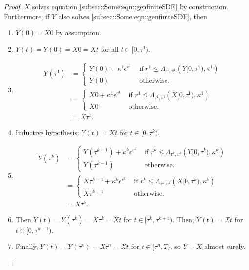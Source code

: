 \documentclass[12pt]{article}
\newcommand{\te}{\text}
\newcommand{\ep}{\epsilon}
\renewcommand{\v}{v}							%
\newcommand{\ev}[1]{\ep^{#1}}					%
\newcommand{\T}{T}								%
\renewcommand{\t}{t}							%
\newcommand{\X}{X}								%
\renewcommand{\r}{r}								%
\newcommand{\rt}[1]{\tau^{#1}}						%
\renewcommand{\it}{k}								%
\newcommand{\rxvtt}[2]{Y_{#1}{(#2)}}				%
\newcommand{\rxvtts}[2]{Y_{#1}{#2}}					%
\newcommand{\ratee}[1]{\Lambda_{#1}}				%
\renewcommand{\mark}[1]{\kappa^{#1}}				%
\begin{document}
\begin{proof}
\(\X{}{}\) solves equation \eqref{subsec::Some:eqn::genfiniteSDE} by construction. Furthermore, if \(\rxvtts{}{}\) also solves \eqref{subsec::Some:eqn::genfiniteSDE}, then 

\begin{enumerate}
\item \(\rxvtt{}{0} = \X{}{0}\) by assumption.

\item \(\rxvtt{}{\t} = \rxvtt{}{0} = \X{}{0} = \X{}{\t}\) for all \(\t\in [0,\rt{1})\).

\item 

\begin{align*}
\rxvtt{}{\rt{1}} &= \begin{cases}
\rxvtt{}{0} + \mark{1}\ev{\v^1} &\te{ if } \r^1 \leq \ratee{\rt{1},\v^1}(\rxvtts{}{[0,\rt{1})},\mark{1})\\
\rxvtt{}{0} &\te{ otherwise.}
\end{cases}\\
&= \begin{cases}
\X{}{0} + \mark{1}\ev{\v^1} &\te{ if } \r^1 \leq \ratee{\rt{1},\v^1}(\X{}{[0,\rt{1})},\mark{1})\\
\X{}{0} &\te{ otherwise.}
\end{cases}\\
&= \X{}{\rt{1}}.
\end{align*}

\item Inductive hypothesis: \(\rxvtt{}{\t} = \X{}{\t}\) for \(\t\in [0,\rt{\it})\). 

\item 

\begin{align*}
\rxvtt{}{\rt{\it}} &= \begin{cases}
\rxvtt{}{\rt{\it-1}} + \mark{\it}\ev{\v^\it} &\te{ if } \r^\it \leq \ratee{\rt{\it},\v^\it}(\rxvtts{}{[0,\rt{\it})},\mark{\it})\\
\rxvtt{}{\rt{\it-1}} &\te{ otherwise.}
\end{cases}\\
&= \begin{cases}
\X{}{\rt{\it-1}} + \mark{\it}\ev{\v^\it} &\te{ if } \r^\it \leq \ratee{\rt{\it},\v^\it}(\X{}{[0,\rt{\it})},\mark{\it})\\
\X{}{\rt{\it-1}} &\te{ otherwise.}
\end{cases}\\
&= \X{}{\rt{\it}}.
\end{align*}

\item Then \(\rxvtt{}{\t} = \rxvtt{}{\rt{\it}} = \X{}{\rt{\it}} = \X{}{\t}\) for \(\t \in [\rt{\it},\rt{\it+1})\). Then, \(\rxvtt{}{\t} = \X{}{\t}\) for \(\t\in [0,\rt{\it+1})\).

\item Finally, \(\rxvtt{}{\t} = \rxvtt{}{\rt{n}} = \X{}{\rt{n}} = \X{}{\t}\) for \(\t\in [\rt{n},\T)\), so \(\rxvtts{}{} = \X{}{}\) almost surely.
\end{enumerate}
\end{proof}
\end{document}
